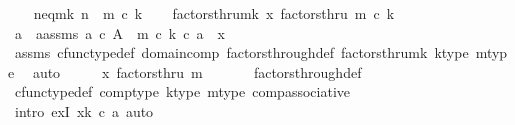 \begin{isabellebody}
\ \ \isamarkupfalse%
\ n{\isacharunderscore}{\kern0pt}eq{\isacharunderscore}{\kern0pt}mk{\isacharcolon}{\kern0pt}\ {\isachardoublequoteopen}n\ {\isacharequal}{\kern0pt}\ m\ {\isasymcirc}\isactrlsub c\ k{\isachardoublequoteclose}\isanewline
\ \ \isamarkupfalse%
\ factorsthru{\isacharunderscore}{\kern0pt}mk{\isacharcolon}{\kern0pt}\ {\isachardoublequoteopen}x\ factorsthru\ {\isacharparenleft}{\kern0pt}m\ {\isasymcirc}\isactrlsub c\ k{\isacharparenright}{\kern0pt}{\isachardoublequoteclose}\isanewline
\ \ \isanewline
\ \ \isamarkupfalse%
\ a\ \ a{\isacharunderscore}{\kern0pt}assms{\isacharcolon}{\kern0pt}\ {\isachardoublequoteopen}a\ {\isasymin}\isactrlsub c\ A\ {\isasymand}\ {\isacharparenleft}{\kern0pt}m\ {\isasymcirc}\isactrlsub c\ k{\isacharparenright}{\kern0pt}\ {\isasymcirc}\isactrlsub c\ a\ {\isacharequal}{\kern0pt}\ x{\isachardoublequoteclose}\isanewline
\ \ \ \ \isamarkupfalse%
\ assms{\isacharparenleft}{\kern0pt}{}{\isacharparenright}{\kern0pt}\ cfunc{\isacharunderscore}{\kern0pt}type{\isacharunderscore}{\kern0pt}def\ domain{\isacharunderscore}{\kern0pt}comp\ factors{\isacharunderscore}{\kern0pt}through{\isacharunderscore}{\kern0pt}def\ factorsthru{\isacharunderscore}{\kern0pt}mk\ k{\isacharunderscore}{\kern0pt}type\ m{\isacharunderscore}{\kern0pt}type\ \isamarkupfalse%
\ auto\isanewline
\ \ \isamarkupfalse%
\ \isamarkupfalse%
\ {\isachardoublequoteopen}x\ factorsthru\ m\ {\isachardoublequoteclose}\isanewline
\ \ \ \ \isamarkupfalse%
\ factors{\isacharunderscore}{\kern0pt}through{\isacharunderscore}{\kern0pt}def\ \isanewline
\ \ \ \ \isamarkupfalse%
\ cfunc{\isacharunderscore}{\kern0pt}type{\isacharunderscore}{\kern0pt}def\ comp{\isacharunderscore}{\kern0pt}type\ k{\isacharunderscore}{\kern0pt}type\ m{\isacharunderscore}{\kern0pt}type\ comp{\isacharunderscore}{\kern0pt}associative\isanewline
\ \ \ \ \isamarkupfalse%
\ {\isacharparenleft}{\kern0pt}intro\ exI{\isacharbrackleft}{\kern0pt}\ x{\isacharequal}{\kern0pt}{\isachardoublequoteopen}k\ {\isasymcirc}\isactrlsub c\ a{\isachardoublequoteclose}{\isacharbrackright}{\kern0pt}{\isacharcomma}{\kern0pt}\ auto{\isacharparenright}{\kern0pt}\isanewline
{}\isamarkupfalse%
%
\endisatagproof
{\isafoldproof}%
%
\isadelimproof
%
\endisadelimproof
%
\isadelimdocument
%
\endisadelimdocument
%
\isatagdocument
%
\isamarkuptrue%
%
\endisatagdocument

\end{isabellebody}
